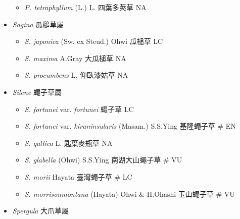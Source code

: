 \begin{itemize}
  \begin{itemize}
        \item[] \textit{P. tetraphyllum} (L.) L.  四葉多莢草   NA
  \end{itemize}
 \item[] \textit{Sagina} 瓜槌草屬
                                
  \begin{itemize}
        \item[] \textit{S. japonica} (Sw. ex Steud.) Ohwi  瓜槌草   LC
        \item[] \textit{S. maxima} A.Gray  大瓜槌草   NA
        \item[] \textit{S. procumbens} L.  仰臥漆姑草   NA
  \end{itemize}
 \item[] \textit{Silene} 蠅子草屬
                                
  \begin{itemize}
        \item[] \textit{S. fortunei} var. \textit{fortunei}   蠅子草   LC
        \item[] \textit{S. fortunei} var. \textit{kiruninsularis} (Masam.) S.S.Ying  基隆蠅子草  \# EN
        \item[] \textit{S. gallica} L.  匙葉麥瓶草   NA
        \item[] \textit{S. glabella} (Ohwi) S.S.Ying  南湖大山蠅子草  \# VU
        \item[] \textit{S. morii} Hayata  臺灣蠅子草  \# LC
        \item[] \textit{S. morrisonmontana} (Hayata) Ohwi \& H.Ohashi  玉山蠅子草  \# VU
  \end{itemize}
 \item[] \textit{Spergula} 大爪草屬
                                

\end{itemize}
